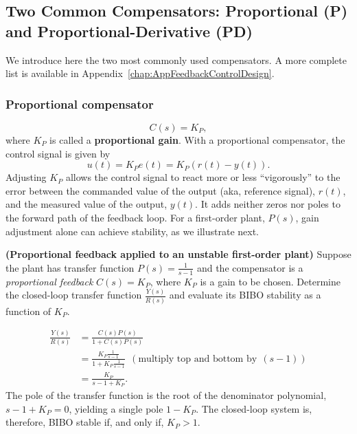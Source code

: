 \subsection{Two Common Compensators: Proportional (P) and Proportional-Derivative (PD)}
\label{sec:feedback:CommonCompensators}

We introduce here the two most commonly used compensators. A more complete list is available in Appendix~\ref{chap:AppFeedbackControlDesign}. 

\subsubsection{Proportional compensator}

\begin{equation}
\label{eq:PropCompensator}
C(s) = K_P,
\end{equation}
where $K_P$ is called a \textbf{proportional gain}. With a proportional compensator, the control signal is given by
$$ u(t) = K_P e(t) = K_P(r(t) - y(t)).$$
Adjusting $K_P$ allows the control signal to react more or less ``vigorously'' to the error between the commanded value of the output (aka, reference signal), $r(t)$, and the measured value of the output, $y(t)$. It adds neither zeros nor poles to the forward path of the feedback loop. For a first-order plant, $P(s)$, gain adjustment alone can achieve stability, as we illustrate next.\\

\begin{example} {\bf (Proportional feedback applied to an unstable first-order plant)}
Suppose the plant has transfer function $P(s)=\frac{1}{s-1}$ and the compensator is a \emph{proportional feedback} $C(s) = K_P$, where $K_P$ is a gain to be chosen. Determine the closed-loop transfer function $\frac{Y(s)}{R(s)}$ and evaluate its BIBO stability as a function of $K_P$.
\end{example}

\solution

  \begin{align*}
  \frac{Y(s)}{R(s)} &= \frac{C(s)P(s)}{1+C(s)P(s)}\\[1em]
    & = \frac{K_P \frac{1}{s-1}}{1+K_P \frac{1}{s-1} }~~ \left(\text{multiply top and bottom by}~~ (s-1)\right) \\[1em]
     & = \frac{K_P}{s-1+K_P}.
\end{align*}
The pole of the transfer function is the root of the denominator polynomial, $s-1+K_P=0$, yielding a single pole $1-K_P$. The closed-loop system is, therefore, BIBO stable if, and only if,  $K_P>1$.
\Qed

